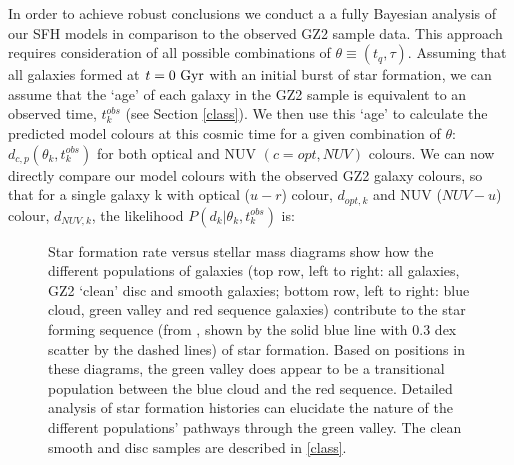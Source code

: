 \documentclass[useAMS,usenatbib]{mn2e}
\def\changed    {\color{titlecol} }
\begin{document}
In order to achieve robust conclusions we conduct a a fully Bayesian analysis \citep{Sivia, MacKay} of our SFH models in comparison to the observed GZ2 sample data. This approach requires consideration of all possible combinations of $\theta \equiv (t_{q}, \tau)$. Assuming that all galaxies formed at $t=0~\rm{Gyr}$ with an initial burst of star formation, we can assume that the `age' of each galaxy in the GZ2 sample is equivalent to an observed time, $t^{obs}_{k}$ (see Section \ref{class}). We then use this  `age' to calculate the predicted model colours at this cosmic time for a given combination of $\theta$: $d_{c,p}(\theta_k, t^{obs}_{k})$ for both optical and NUV $(c={opt,NUV})$ colours. We can now directly compare our model colours with the observed GZ2 galaxy colours, so that for a single galaxy k with optical ($u-r$) colour, $d_{opt, k}$ and NUV ($NUV-u$) colour, $d_{NUV,k}$, the {\changed likelihood $P(d_{k}|\theta_k, t^{obs}_{k})$ is}:

\begin{figure}
\caption{Star formation rate versus stellar mass diagrams show how the different populations of galaxies  (top row, left to right: all galaxies, GZ2 `clean' disc and smooth galaxies; bottom row, left to right: blue cloud, green valley and red sequence galaxies) contribute to the star forming sequence (from \citet{Peng}, shown by the solid blue line with 0.3 dex scatter by the dashed lines) of star formation. Based on positions in these diagrams, the green valley does appear to be a transitional population between the blue cloud and the red sequence. Detailed analysis of star formation histories can elucidate the nature of the different populations' pathways through the green valley. The clean smooth and disc samples are described in \ref{class}.}
\label{sfr_mass_sub}
\end{figure}
\end{document}
